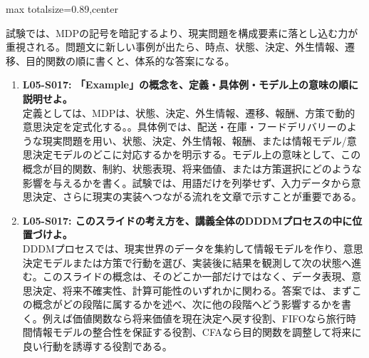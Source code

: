 \begin{minipage}[t]{0.58\textwidth}
\begin{adjustbox}{max totalsize={\textwidth}{0.89\textheight},center}
\begin{minipage}{\textwidth}
試験では、MDPの記号を暗記するより、現実問題を構成要素に落とし込む力が重視される。問題文に新しい事例が出たら、時点、状態、決定、外生情報、遷移、目的関数の順に書くと、体系的な答案になる。\par{}\begin{enumerate}\item \textbf{L05-S017: 「Example」の概念を、定義・具体例・モデル上の意味の順に説明せよ。}\\定義としては、MDPは、状態、決定、外生情報、遷移、報酬、方策で動的意思決定を定式化する。。具体例では、配送・在庫・フードデリバリーのような現実問題を用い、状態、決定、外生情報、報酬、または情報モデル/意思決定モデルのどこに対応するかを明示する。モデル上の意味として、この概念が目的関数、制約、状態表現、将来価値、または方策選択にどのような影響を与えるかを書く。試験では、用語だけを列挙せず、入力データから意思決定、さらに現実の実装へつながる流れを文章で示すことが重要である。\item \textbf{L05-S017: このスライドの考え方を、講義全体のDDDMプロセスの中に位置づけよ。}\\DDDMプロセスでは、現実世界のデータを集約して情報モデルを作り、意思決定モデルまたは方策で行動を選び、実装後に結果を観測して次の状態へ進む。このスライドの概念は、そのどこか一部だけではなく、データ表現、意思決定、将来不確実性、計算可能性のいずれかに関わる。答案では、まずこの概念がどの段階に属するかを述べ、次に他の段階へどう影響するかを書く。例えば価値関数なら将来価値を現在決定へ戻す役割、FIFOなら旅行時間情報モデルの整合性を保証する役割、CFAなら目的関数を調整して将来に良い行動を誘導する役割である。\end{enumerate}
\end{minipage}
\end{adjustbox}
\end{minipage}



